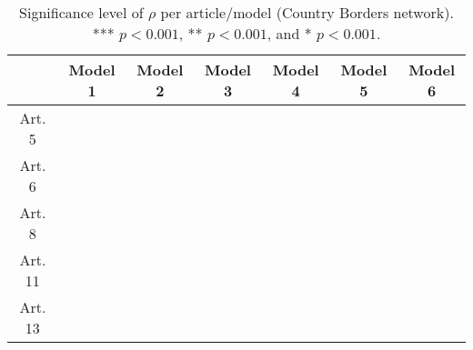 \begin{table}[ht]
\centering
\begin{tabular}{ccccccc}
  \toprule
 & Model 1 & Model 2 & Model 3 & Model 4 & Model 5 & Model 6 \\ 
  \midrule
Art. 5 &   &   &   &   &   &   \\ 
   \midrule
Art. 6 &   &   &   &   &   &   \\ 
   \midrule
Art. 8 &   &   &   &   &   &   \\ 
   \midrule
Art. 11 &   &   &   &   &   &   \\ 
   \midrule
Art. 13 &   &   &   &   &   &   \\ 
   \bottomrule
\end{tabular}
\caption{Significance level of $\rho$ per article/model (Country Borders network). *** $p < 0.001$, ** $p < 0.001$, and * $p < 0.001$.} 
\end{table}
